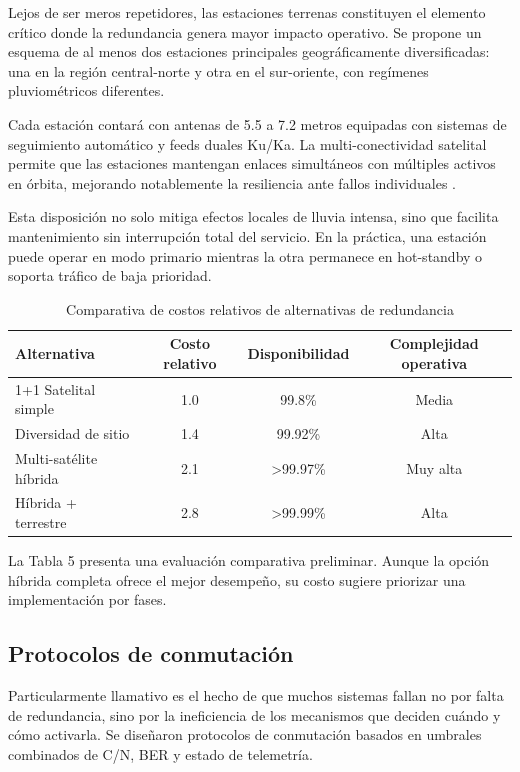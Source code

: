 Lejos de ser meros repetidores, las estaciones terrenas constituyen el elemento crítico donde la redundancia genera mayor impacto operativo. Se propone un esquema de al menos dos estaciones principales geográficamente diversificadas: una en la región central-norte y otra en el sur-oriente, con regímenes pluviométricos diferentes.

Cada estación contará con antenas de 5.5 a 7.2 metros equipadas con sistemas de seguimiento automático y feeds duales Ku/Ka. La multi-conectividad satelital permite que las estaciones mantengan enlaces simultáneos con múltiples activos en órbita, mejorando notablemente la resiliencia ante fallos individuales \cite{MultiSatConnectivity2023}.

Esta disposición no solo mitiga efectos locales de lluvia intensa, sino que facilita mantenimiento sin interrupción total del servicio. En la práctica, una estación puede operar en modo primario mientras la otra permanece en hot-standby o soporta tráfico de baja prioridad.

\begin{table}[h]
\centering
\caption{Comparativa de costos relativos de alternativas de redundancia}
\label{tab:costos}
\begin{tabular}{lccc}
\hline
\textbf{Alternativa} & \textbf{Costo relativo} & \textbf{Disponibilidad} & \textbf{Complejidad operativa} \\
\hline
1+1 Satelital simple & 1.0 & 99.8\% & Media \\
Diversidad de sitio & 1.4 & 99.92\% & Alta \\
Multi-satélite híbrida & 2.1 & >99.97\% & Muy alta \\
Híbrida + terrestre & 2.8 & >99.99\% & Alta \\
\hline
\end{tabular}
\end{table}

La Tabla 5 presenta una evaluación comparativa preliminar. Aunque la opción híbrida completa ofrece el mejor desempeño, su costo sugiere priorizar una implementación por fases.

\subsection{Protocolos de conmutación}

Particularmente llamativo es el hecho de que muchos sistemas fallan no por falta de redundancia, sino por la ineficiencia de los mecanismos que deciden cuándo y cómo activarla. Se diseñaron protocolos de conmutación basados en umbrales combinados de C/N, BER y estado de telemetría.

